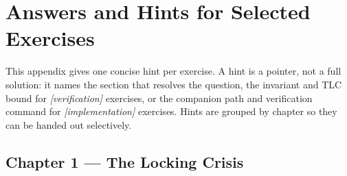 \chapter{Answers and Hints for Selected Exercises}
\label{chap:answers}

This appendix gives one concise hint per exercise.  A hint is a pointer,
not a full solution: it names the section that resolves the question, the
invariant and TLC bound for \emph{[verification]} exercises, or the
companion path and verification command for \emph{[implementation]}
exercises.  Hints are grouped by chapter so they can be handed out
selectively.

\section*{Chapter 1 --- The Locking Crisis}

